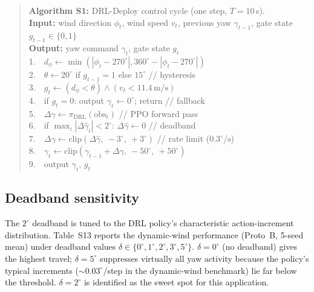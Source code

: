 \documentclass{article}
\begin{document}
\begin{quote}
\noindent\textbf{Algorithm S1:} DRL-Deploy control cycle (one step, $T{=}10$\,s).\\
\textbf{Input:} wind direction $\phi_t$, wind speed $v_t$, previous yaw $\gamma_{t-1}$, gate state $g_{t-1} \in \{0,1\}$\\
\textbf{Output:} yaw command $\gamma_t$, gate state $g_t$\\
1.\ \ $d_\phi \leftarrow \min(|\phi_t - 270^\circ|, 360^\circ - |\phi_t - 270^\circ|)$\\
2.\ \ $\theta \leftarrow 20^\circ$ if $g_{t-1}{=}1$ else $15^\circ$ \hfill // hysteresis\\
3.\ \ $g_t \leftarrow (d_\phi < \theta) \land (v_t < 11.4\,\mathrm{m/s})$\\
4.\ \ if $g_t = 0$: output $\gamma_t \leftarrow 0^\circ$; return \hfill // fallback\\
5.\ \ $\Delta\hat{\gamma} \leftarrow \pi_\mathrm{DRL}(\text{obs}_t)$ \hfill // PPO forward pass\\
6.\ \ if $\max_i|\Delta\hat{\gamma}_i| < 2^\circ$: $\Delta\hat{\gamma} \leftarrow 0$ \hfill // deadband\\
7.\ \ $\Delta\gamma \leftarrow \mathrm{clip}(\Delta\hat{\gamma},\ -3^\circ,\ +3^\circ)$ \hfill // rate limit ($0.3^\circ\!/\!\mathrm{s}$)\\
8.\ \ $\gamma_t \leftarrow \mathrm{clip}(\gamma_{t-1} + \Delta\gamma,\ -50^\circ,\ +50^\circ)$\\
9.\ \ output $\gamma_t$, $g_t$
\end{quote}

\subsection{Deadband sensitivity}

The $2^\circ$ deadband is tuned to the DRL policy's characteristic action-increment distribution. Table~S13 reports the dynamic-wind performance (Proto~B, 5-seed mean) under deadband values $\delta{\in}\{0^\circ,1^\circ,2^\circ,3^\circ,5^\circ\}$. $\delta{=}0^\circ$ (no deadband) gives the highest travel; $\delta{=}5^\circ$ suppresses virtually all yaw activity because the policy's typical increments (${\sim}0.03^\circ$/step in the dynamic-wind benchmark) lie far below the threshold. $\delta{=}2^\circ$ is identified as the sweet spot for this application.
\end{document}
